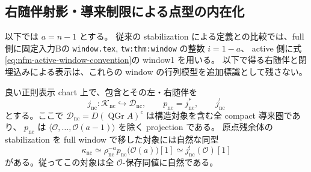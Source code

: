 \subsection{右随伴射影・導来制限による点型の内在化}

以下では $a=n-1$ とする。
従来の stabilization による定義との比較では、full 側に固定入力Bの
\texttt{window.tex}, \texttt{tw:thm:window} の整数 $i=1-a$、
active 側に式\eqref{eq:nfm-active-window-convention}の window1 を用いる。
以下で得る右随伴と閉埋込みによる表示は、これらの window の行列模型を追加標識として残さない。

\begin{lemma}[原点対象と構造対象への右随伴射影]
\label{lem:nfm-origin-object-weight-zero}
良い正則表示 chart 上で、包含とその左・右随伴を
\[
 j_{\mathrm{nc}}:\mathcal K_{\mathrm{nc}}\hookrightarrow\mathcal D_{\mathrm{nc}},
 \qquad p_{\mathrm{nc}}=j_{\mathrm{nc}}^*,
 \qquad j_{\mathrm{nc}}^!
\]
とする。ここで $\mathcal D_{\mathrm{nc}}=D(\operatorname{QGr}A)^c$ は構造対象を含む全 compact 導来圏であり、
$p_{\mathrm{nc}}$ は $\langle\mathcal O,\ldots,\mathcal O(a-1)\rangle$ を除く projection である。
原点残余体の stabilization を full window で移した対象には自然な同型
\begin{equation}\label{eq:nfm-origin-object-intrinsic}
 \kappa_{\mathrm{nc}}
 \simeq\rho_{\mathrm{nc}}^{-a}p_{\mathrm{nc}}\bigl(\mathcal O(a)\bigr)[1]
 \simeq j_{\mathrm{nc}}^!(\mathcal O)[1]
\end{equation}
がある。従ってこの対象は全 $\mathcal O$-保存同値に自然である。
\end{lemma}

